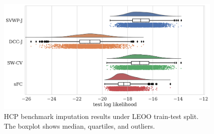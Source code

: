 \begin{figure}[t]
  \centering
  \includegraphics[width=\textwidth]{fig/hcp/d15/imputation_study/LEOO_multivariate_test_log_likelihoods_raincloud}
  \caption{
    HCP benchmark imputation results under LEOO train-test split.
    The boxplot shows median, quartiles, and outliers.
  }\label{fig:hcp-results-LEOO-multivariate}
\end{figure}


